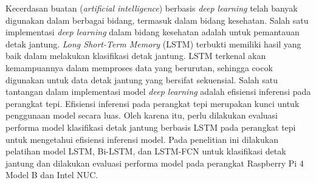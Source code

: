 \documentclass{skripsi}
\begin{document}
{\abstractind

  \noindent
  Kecerdasan buatan (\textit{artificial intelligence}) berbasis \textit{deep learning} telah banyak digunakan dalam berbagai bidang, termasuk dalam bidang kesehatan.
  Salah satu implementasi \textit{deep learning} dalam bidang kesehatan adalah untuk pemantauan detak jantung.
  \textit{Long Short-Term Memory} (LSTM) terbukti memiliki hasil yang baik dalam melakukan klasifikasi detak jantung.
  LSTM terkenal akan kemampuannya dalam memproses data yang berurutan, sehingga cocok digunakan untuk data detak jantung yang bersifat sekuensial.
  Salah satu tantangan dalam implementasi model \textit{deep learning} adalah efisiensi inferensi pada perangkat tepi.
  Efisiensi inferensi pada perangkat tepi merupakan kunci untuk penggunaan model secara luas.
  Oleh karena itu, perlu dilakukan evaluasi performa model klasifikasi detak jantung berbasis LSTM pada perangkat tepi untuk mengetahui efisiensi inferensi model.
  Pada penelitian ini dilakukan pelatihan model LSTM, Bi-LSTM, dan LSTM-FCN untuk klasifikasi detak jantung dan dilakukan evaluasi performa model pada perangkat Raspberry Pi 4 Model B dan Intel NUC.
}
\end{document}
